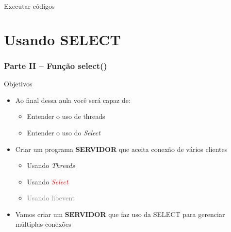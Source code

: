\documentclass[10pt, xcolor=x11names]{beamer}
\begin{document}

\begin{frame}
	\centering
 	\Huge
	Executar códigos
\end{frame}

\section{Usando SELECT}
\begin{frame} \frametitle{Parte II -- Função select()}
	\begin{block}{Objetivos}
		\begin{itemize}
			\item Ao final dessa aula você será capaz de:
			\begin{itemize}
				\item Entender o uso de threads
				\item Entender o uso do \textit{Select}
			\end{itemize}
			\item Criar um programa \textbf{SERVIDOR} que aceita conexão de vários clientes
			\begin{itemize}
				\item Usando \textit{Threads}
				\item Usando \textcolor<2->{red}{\textit{Select}}
				\item \textcolor{gray}{Usando libevent}
			\end{itemize}
		\end{itemize}
		\begin{itemize}
			\item<2-> Vamos criar um \textbf{SERVIDOR} que faz uso da SELECT para gerenciar múltiplas conexões
		\end{itemize}
	\end{block}
\end{frame}

\end{document}
